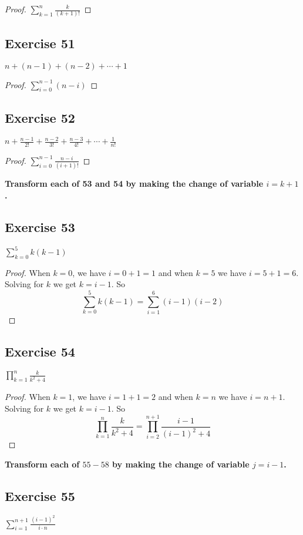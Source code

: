 \documentclass[14pt]{extarticle}
\newcommand{\dps}{\displaystyle}
\newcommand{\cy}{\color{cyan}}
\begin{document}
\begin{proof}
    $\dps\sum_{k=1}^{n}\frac{k}{(k+1)!}$
\end{proof}

\subsection{Exercise 51}
$n + (n - 1) + (n - 2) + \cdots + 1$

\begin{proof}
    $\dps\sum_{i=0}^{n-1}(n-i)$
\end{proof}

\subsection{Exercise 52}
$\dps n + \frac{n-1}{2!} + \frac{n-2}{3!} + \frac{n-3}{4!} + \cdots + \frac{1}{n!}$

\begin{proof}
    $\dps\sum_{i=0}^{n-1}\frac{n-i}{(i+1)!}$
\end{proof}

{\bf\cy Transform each of 53 and 54 by making the change of
variable $i = k + 1$.}

\subsection{Exercise 53}
$\dps\sum_{k=0}^{5}k(k-1)$

\begin{proof}
    When $k = 0$, we have $i = 0+1 = 1$ and when $k = 5$ we have $i = 5+1 = 6$. Solving for $k$ we get $k = i-1$. So
    \[
        \sum_{k=0}^{5}k(k-1) = \sum_{i=1}^{6}(i-1)(i-2)
    \]
\end{proof}

\subsection{Exercise 54}
$\dps\prod_{k=1}^{n}\frac{k}{k^2+4}$

\begin{proof}
    When $k = 1$, we have $i = 1+1 = 2$ and when $k = n$ we have $i = n+1$. Solving for $k$ we get $k = i-1$. So
    \[
        \prod_{k=1}^{n}\frac{k}{k^2+4} = \prod_{i=2}^{n+1}\frac{i-1}{(i-1)^2+4}
    \]
\end{proof}

{\bf\cy Transform each of $55-58$ by making the change of variable $j = i - 1$.}

\subsection{Exercise 55}
$\dps\sum_{i=1}^{n+1}\frac{(i-1)^2}{i\cdot n}$
\end{document}
